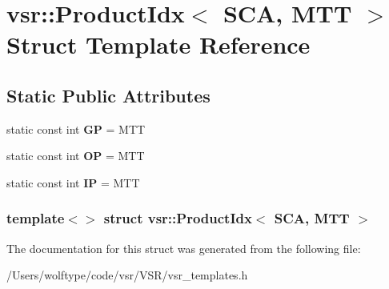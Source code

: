 \hypertarget{structvsr_1_1_product_idx_3_01_s_c_a_00_01_m_t_t_01_4}{\section{vsr\-:\-:Product\-Idx$<$ S\-C\-A, M\-T\-T $>$ Struct Template Reference}
\label{structvsr_1_1_product_idx_3_01_s_c_a_00_01_m_t_t_01_4}
}
\subsection*{Static Public Attributes}
\begin{DoxyCompactItemize}
\item 
\hypertarget{structvsr_1_1_product_idx_3_01_s_c_a_00_01_m_t_t_01_4_ac4c65ab2096885318511d3b0ba75f955}{static const int {\bfseries G\-P} = M\-T\-T}\label{structvsr_1_1_product_idx_3_01_s_c_a_00_01_m_t_t_01_4_ac4c65ab2096885318511d3b0ba75f955}

\item 
\hypertarget{structvsr_1_1_product_idx_3_01_s_c_a_00_01_m_t_t_01_4_a71147e70653206c5e7e3ecea6cfe13d9}{static const int {\bfseries O\-P} = M\-T\-T}\label{structvsr_1_1_product_idx_3_01_s_c_a_00_01_m_t_t_01_4_a71147e70653206c5e7e3ecea6cfe13d9}

\item 
\hypertarget{structvsr_1_1_product_idx_3_01_s_c_a_00_01_m_t_t_01_4_aaee3ae8bb23c70195238fd8a584c344c}{static const int {\bfseries I\-P} = M\-T\-T}\label{structvsr_1_1_product_idx_3_01_s_c_a_00_01_m_t_t_01_4_aaee3ae8bb23c70195238fd8a584c344c}

\end{DoxyCompactItemize}
\subsubsection*{template$<$$>$ struct vsr\-::\-Product\-Idx$<$ S\-C\-A, M\-T\-T $>$}



The documentation for this struct was generated from the following file\-:\begin{DoxyCompactItemize}
\item 
/\-Users/wolftype/code/vsr/\-V\-S\-R/vsr\-\_\-templates.\-h\end{DoxyCompactItemize}
